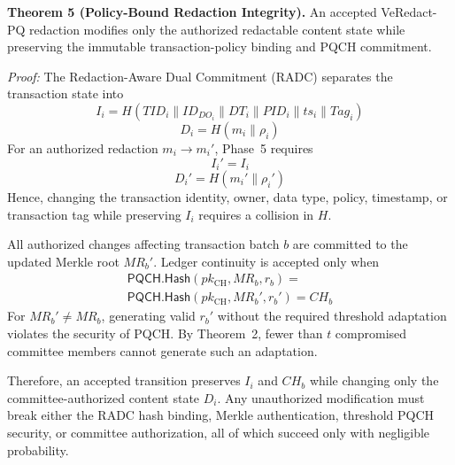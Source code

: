 \documentclass[lettersize,journal]{IEEEtran}
\begin{document}
    \textbf{Theorem 5 (Policy-Bound Redaction Integrity).}
    An accepted VeRedact-PQ redaction modifies only the authorized
    redactable content state while preserving the immutable
    transaction-policy binding and PQCH commitment.
    
    \emph{Proof:}
    The Redaction-Aware Dual Commitment (RADC) separates the transaction
    state into
    \begin{equation}
    I_i=
    H(TID_i\parallel ID_{DO_i}\parallel DT_i
    \parallel PID_i\parallel ts_i\parallel Tag_i)
    \end{equation}
    \begin{equation}
    { D_i=H(m_i\parallel\rho_i)}
    \label{eq:sec_radc_original}
    \end{equation}
    For an authorized redaction $m_i\rightarrow m_i'$, Phase~5 requires
    \begin{equation}
    I_i'=I_i
    \end{equation}
    \begin{equation}
    { D_i'=H(m_i'\parallel\rho_i')}
    \label{eq:sec_radc_transition}
    \end{equation}
    Hence, changing the transaction identity, owner, data type, policy, timestamp, or transaction tag while preserving $I_i$ requires a collision in $H$.
    
    All authorized changes affecting transaction batch $b$ are committed to the updated Merkle root $MR_b'$. Ledger continuity is accepted only when
    \begin{equation}
    \begin{split}
    \mathsf{PQCH.Hash}(pk_{\mathrm{CH}},MR_b,r_b)
    =\\
    \mathsf{PQCH.Hash}(pk_{\mathrm{CH}},MR_b',r_b')
    =
    CH_b
    \label{eq:sec_ch_continuity}
    \end{split}
    \end{equation}
    For $MR_b'\neq MR_b$, generating valid $r_b'$ without the required
    threshold adaptation violates the security of PQCH. By Theorem~2,
    fewer than $t$ compromised committee members cannot generate such an
    adaptation.
    
    Therefore, an accepted transition preserves $I_i$ and $CH_b$ while changing only the committee-authorized content state $D_i$. Any unauthorized modification must break either the RADC hash binding, Merkle authentication, threshold PQCH security, or committee authorization, all of which succeed only with negligible probability.
     
\end{document}
